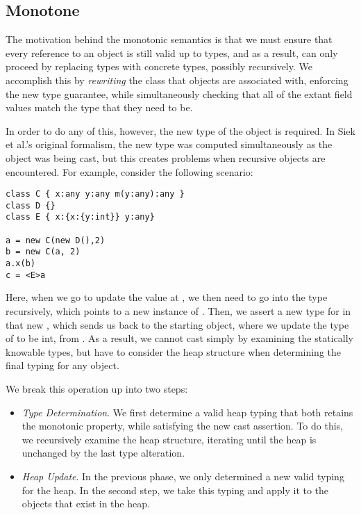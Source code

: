 \documentclass[a4paper,UKenglish,final]{lipics}
\begin{document}
\subsection{Monotone}

The motivation behind the monotonic semantics is that we must ensure that every reference to an object is still valid up to \any types, and as a result, can only proceed by replacing \any types with concrete types, possibly recursively. We accomplish this by \emph{rewriting} the class that objects are associated with, enforcing the new type guarantee, while simultaneously checking that all of the extant field values match the type that they need to be.

In order to do any of this, however, the new type of the object is required. In Siek et al.'s original formalism, the new type was computed simultaneously as the object was being cast, but this creates problems when recursive objects are encountered. For example, consider the following scenario:

\begin{verbatim}
class C { x:any y:any m(y:any):any }
class D {}
class E { x:{x:{y:int}} y:any}

a = new C(new D(),2)
b = new C(a, 2)
a.x(b)
c = <E>a
\end{verbatim}

Here, when we go to update the value at \x, we then need to go into the type recursively, which points to a new instance of \C. Then, we assert a new type for \x in that new \C, which sends us back to the starting object, where we update the type of  to be int, from \any. As a result, we cannot cast simply by examining the statically knowable types, but have to consider the heap structure when determining the final typing for any object.

We break this operation up into two steps:

\begin{itemize}
\item \emph{Type Determination}. We first determine a valid heap typing that both retains the monotonic property, while satisfying the new cast assertion. To do this, we recursively examine the heap structure, iterating until the heap is unchanged by the last type alteration.
\item \emph{Heap Update}. In the previous phase, we only determined a new valid typing for the heap. In the second step, we take this typing and apply it to the objects that exist in the heap.
\end{itemize}
\end{document}
